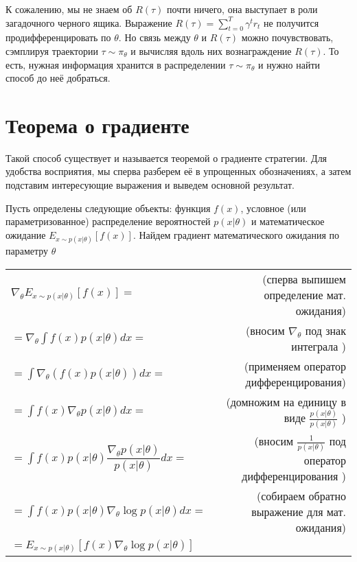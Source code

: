\documentclass[a4paper,12pt]{article}
\numberwithin{equation}{section}
\begin{document}
К сожалению, мы не знаем об $R(\tau)$ почти ничего, она выступает в роли загадочного черного ящика. Выражение $R(\tau) = \sum_{t = 0}^{T} \gamma^{t} r_t$ не получится продифференцировать по $\theta$. Но связь между $\theta$ и $R(\tau)$ можно почувствовать, сэмплируя траектории $\tau \sim \pi_{\theta}$ и вычисляя вдоль них вознаграждение $R(\tau)$. То есть, нужная информация хранится в распределении $\tau \sim \pi_{\theta}$  и нужно найти способ до неё добраться.

\section{Теорема о градиенте}

Такой способ существует и называется теоремой о градиенте стратегии. Для удобства восприятия, мы сперва разберем её в упрощенных обозначениях, а затем подставим интересующие выражения и выведем основной результат.

Пусть определены следующие объекты: функция $f(x)$, условное (или параметризованное) распределение вероятностей $p(x | \theta)$ и математическое ожидание $E_{x \sim p(x|\theta)} \left[ f(x)\right]$. Найдем градиент математического ожидания по параметру $\theta$ \\

\begin{tabular}{lr}
$\nabla_\theta E_{x \sim p(x|\theta)} \left[ f(x)\right] = $  & (сперва выпишем определение мат. ожидания) \\ [1ex] 
$ = \nabla_\theta \int f(x) p(x | \theta) dx =$ & (вносим $\nabla_\theta$ под знак интеграла ) \\ [1ex]
$ =  \int \nabla_\theta \left( f(x) p(x | \theta) \right) dx =$ & (применяем оператор дифференцирования) \\ [1ex]
$ =  \int f(x) \nabla_\theta p(x | \theta) dx =$ & (домножим на единицу в виде $\frac{p(x | \theta)}{p(x | \theta)}$ ) \\ [1ex]
$ =  \int f(x) p(x | \theta) \dfrac{\nabla_\theta p(x | \theta)}{p(x | \theta)}  dx =$ & (вносим  $\frac{1}{p(x | \theta)}$ под оператор дифференцирования  ) \\ [2ex]
$ =  \int f(x) p(x | \theta) \nabla_\theta \log p(x | \theta) dx =$ & (собираем обратно выражение для мат. ожидания) \\ [1ex] 
$= E_{x \sim p(x|\theta)} \left[ f(x) \nabla_\theta \log p(x | \theta) \right]  $  & \\ [2ex]
\end{tabular}
\end{document}
